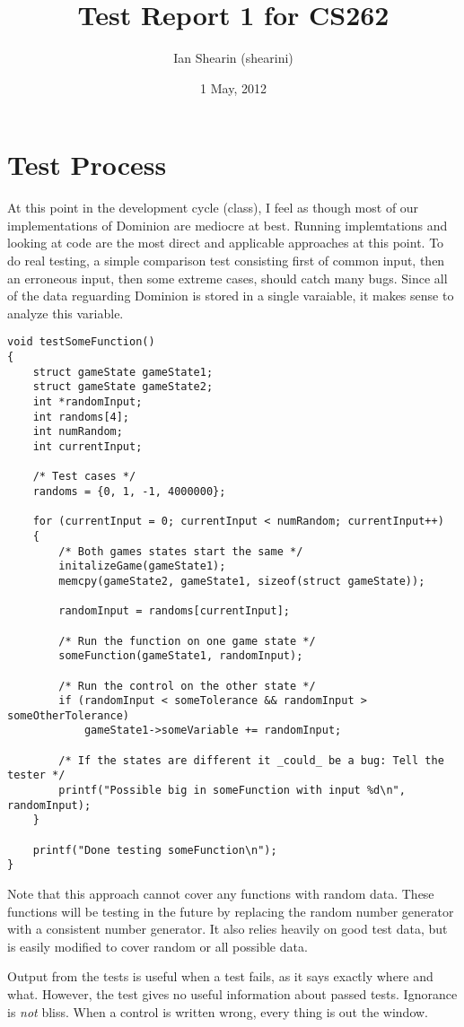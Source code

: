\documentclass[letterpaper,12pt]{article}
\title{Test Report 1 for CS262}
\date{1 May, 2012}
\author{Ian Shearin (shearini)}
\begin{document}
\maketitle


\section{Test Process}
At this point in the development cycle (class), I feel as though most of our
implementations of Dominion are mediocre at best. Running implemtations and
looking at code are the most direct and applicable approaches at this point. To
do real testing, a simple comparison test consisting first of common input,
then an erroneous input, then some extreme cases, should catch many bugs. Since
all of the data reguarding Dominion is stored in a single varaiable, it makes
sense to analyze this variable.

\begin{verbatim}
void testSomeFunction()
{
	struct gameState gameState1;
	struct gameState gameState2;
	int *randomInput;
	int randoms[4];
	int numRandom;
	int currentInput;

	/* Test cases */
	randoms = {0, 1, -1, 4000000};

	for (currentInput = 0; currentInput < numRandom; currentInput++)
	{
		/* Both games states start the same */
		initalizeGame(gameState1);
		memcpy(gameState2, gameState1, sizeof(struct gameState));

		randomInput = randoms[currentInput];

		/* Run the function on one game state */
		someFunction(gameState1, randomInput);

		/* Run the control on the other state */
		if (randomInput < someTolerance && randomInput > someOtherTolerance)
			gameState1->someVariable += randomInput;

		/* If the states are different it _could_ be a bug: Tell the tester */
		printf("Possible big in someFunction with input %d\n", randomInput);
	}

	printf("Done testing someFunction\n");
}
\end{verbatim}

Note that this approach cannot cover any functions with random data. These
functions will be testing in the future by replacing the random number
generator with a consistent number generator. It also relies heavily on good
test data, but is easily modified to cover random or all possible data.

Output from the tests is useful when a test fails, as it says exactly where
and what. However, the test gives no useful information about passed tests.
Ignorance is {\em not} bliss. When a control is written wrong, every thing is
out the window.
\end{document}
